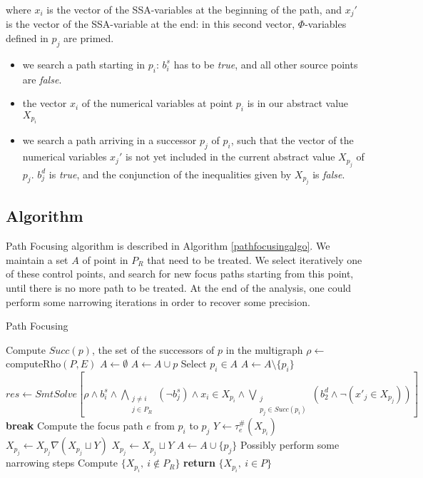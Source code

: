 \documentclass[a4paper,english,titlepage,11pt]{report}
\begin{document}
	where $x_i$ is the vector of the SSA-variables at the beginning of the path,
	and $x_j'$ is the vector of the SSA-variable at the end: in this second
	vector, $\Phi$-variables defined in $p_j$ are primed.

	\begin{itemize}
	\item we search a path starting in $p_i$: $b_i^s$ has to be \emph{true}, and
	all other source points are \emph{false}.
	\item the vector $x_i$ of the numerical variables at point $p_i$ is in our
	abstract value $X_{p_i}$
	\item we search a path arriving in a successor $p_j$ of $p_i$, such that the
	vector of the numerical variables $x_j'$ is not yet included in the current
	abstract value $X_{p_j}$ of $p_j$. $b_j^d$ is \emph{true}, and the
	conjunction of the inequalities given by $X_{p_j}$ is \emph{false}.
	\end{itemize}

	\subsection{Algorithm}
	
	Path Focusing algorithm is described in Algorithm \ref{pathfocusingalgo}.
	We maintain a set $A$ of point in $P_R$ that need to be treated.
	We select iteratively one of these control points, and search for new focus
	paths starting from this point, until there is no more path to be treated.
	At the end of the analysis, one could perform some narrowing iterations in
	order to recover some precision.
\begin{algorithm}
\caption{Path Focusing}\label{pathfocusingalgo}
\begin{algorithmic}[1] 
	\State Compute $Succ(p)$, the set of the successors of $p$ in the multigraph
\EndFor
\State $\rho \gets$ computeRho$(P,E)$
\State $A \gets \emptyset$
	\State $A \gets A \cup p$
\EndFor
{}
	\State Select $p_i \in A$
	\State $A \gets A \setminus \{p_i\}$
		\State $res \gets SmtSolve\left[\rho \wedge b_i^s \wedge
		\displaystyle\bigwedge_{\substack{j\neq i \\
		j\in P_R}} (\neg b_j^s) \wedge x_i \in X_{p_i} \wedge
		\bigvee_{\substack{j \\ p_j\in Succ(p_i)}} \left(b_2^d \wedge \neg (x'_j \in
		X_{p_j})\right)\right]$
			\State \textbf{break}
		\EndIf
		\State Compute the focus path $e$ from $p_i$ to $p_j$
		\State $Y \gets \tau_e^\#(X_{p_i})$
			\State $X_{p_j} \gets X_{p_j} \nabla (X_{p_j} \sqcup Y)$
		\Else
			\State $X_{p_j} \gets X_{p_j} \sqcup Y$
		\EndIf
		\State $A \gets A \cup \{p_j\}$
	\EndWhile
\EndWhile
\State Possibly perform some narrowing steps
\State Compute $\{X_{p_i},\ i \notin P_R\}$
\State \textbf{return} $\{X_{p_i},\ i \in P\}$
\EndProcedure
\end{algorithmic}
\end{algorithm}
\end{document}
